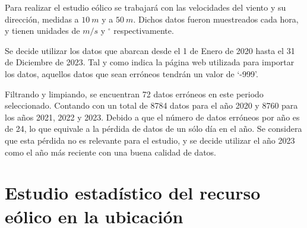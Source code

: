 \documentclass[12pt]{report}
\begin{document}


Para realizar el estudio eólico se trabajará con las velocidades del viento y su dirección, medidas a $10\ m$ y a $50\ m$. Dichos datos fueron muestreados cada hora, y tienen unidades de $m/s$ y $^\circ$ respectivamente.


Se decide utilizar los datos que abarcan desde el 1 de Enero de 2020 hasta el 31 de Diciembre de 2023. Tal y como indica la página web utilizada para importar los datos, aquellos datos que sean erróneos tendrán un valor de `-999'. 


Filtrando y limpiando, se encuentran 72 datos erróneos en este periodo seleccionado. Contando con un total de 8784 datos para el año 2020 y 8760 para los años 2021, 2022 y 2023. Debido a que el número de datos erróneos por año es de 24, lo que equivale a la pérdida de datos de un sólo día en el año. Se considera que esta pérdida no es relevante para el estudio, y se decide utilizar el año 2023 como el año más reciente con una buena calidad de datos.


\section{Estudio estadístico del recurso eólico en la ubicación}


\end{document}
